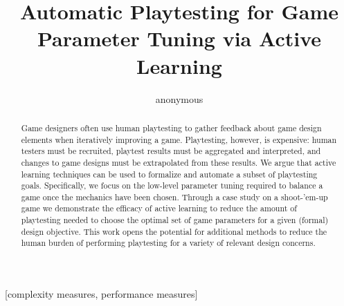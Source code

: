 \documentclass{sig-alternate}
\begin{document}
%

\title{Automatic Playtesting for Game Parameter Tuning via Active Learning}



\author{
\alignauthor
anonymous
}


\maketitle
\begin{abstract}
Game designers often use human playtesting to gather feedback about game design elements when iteratively improving a game.
Playtesting, however, is expensive: human testers must be recruited, playtest results must be aggregated and interpreted, and changes to game designs must be extrapolated from these results.
We argue that active learning techniques can be used to formalize and automate a subset of playtesting goals.
Specifically, we focus on the low-level parameter tuning required to balance a game once the mechanics have been chosen.
Through a case study on a shoot-'em-up game we demonstrate the efficacy of active learning to reduce the amount of playtesting needed to choose the optimal set of game parameters for a given (formal) design objective.
This work opens the potential for additional methods to reduce the human burden of performing playtesting for a variety of relevant design concerns.
\end{abstract}

[complexity measures, performance measures]

\end{document}
